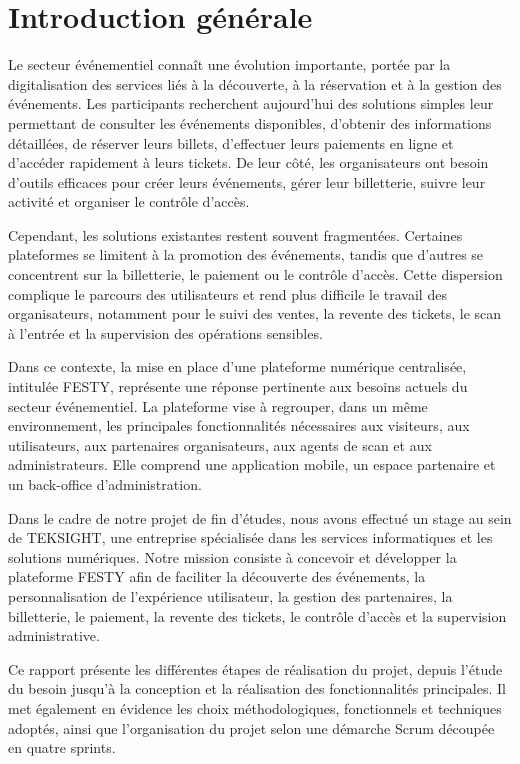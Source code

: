 \chapter*{Introduction générale}
\label{chap:introduction-generale}


Le secteur événementiel connaît une évolution importante, portée par la digitalisation des services liés à la découverte, à la réservation et à la gestion des événements. Les participants recherchent aujourd’hui des solutions simples leur permettant de consulter les événements disponibles, d’obtenir des informations détaillées, de réserver leurs billets, d’effectuer leurs paiements en ligne et d’accéder rapidement à leurs tickets. De leur côté, les organisateurs ont besoin d’outils efficaces pour créer leurs événements, gérer leur billetterie, suivre leur activité et organiser le contrôle d’accès.

Cependant, les solutions existantes restent souvent fragmentées. Certaines plateformes se limitent à la promotion des événements, tandis que d’autres se concentrent sur la billetterie, le paiement ou le contrôle d’accès. Cette dispersion complique le parcours des utilisateurs et rend plus difficile le travail des organisateurs, notamment pour le suivi des ventes, la revente des tickets, le scan à l’entrée et la supervision des opérations sensibles.

Dans ce contexte, la mise en place d’une plateforme numérique centralisée, intitulée FESTY, représente une réponse pertinente aux besoins actuels du secteur événementiel. La plateforme vise à regrouper, dans un même environnement, les principales fonctionnalités nécessaires aux visiteurs, aux utilisateurs, aux partenaires organisateurs, aux agents de scan et aux administrateurs. Elle comprend une application mobile, un espace partenaire et un back-office d’administration.

Dans le cadre de notre projet de fin d’études, nous avons effectué un stage au sein de TEKSIGHT, une entreprise spécialisée dans les services informatiques et les solutions numériques. Notre mission consiste à concevoir et développer la plateforme FESTY afin de faciliter la découverte des événements, la personnalisation de l’expérience utilisateur, la gestion des partenaires, la billetterie, le paiement, la revente des tickets, le contrôle d’accès et la supervision administrative.

Ce rapport présente les différentes étapes de réalisation du projet, depuis l’étude du besoin jusqu’à la conception et la réalisation des fonctionnalités principales. Il met également en évidence les choix méthodologiques, fonctionnels et techniques adoptés, ainsi que l’organisation du projet selon une démarche Scrum découpée en quatre sprints.

